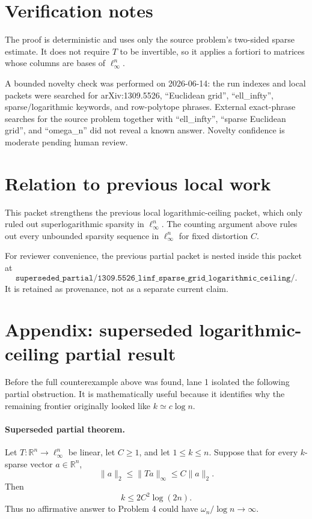 \documentclass[11pt]{article}
\begin{document}
\section*{Verification notes}

The proof is deterministic and uses only the source problem's two-sided
sparse estimate.  It does not require $T$ to be invertible, so it applies
a fortiori to matrices whose columns are bases of $\ell_\infty^n$.

A bounded novelty check was performed on 2026-06-14: the run indexes and
local packets were searched for arXiv:1309.5526, ``Euclidean grid'',
``ell\_infty'', sparse/logarithmic keywords, and row-polytope phrases.
External exact-phrase searches for the source problem together with
``ell\_infty'', ``sparse Euclidean grid'', and ``omega\_n'' did not reveal a
known answer.  Novelty confidence is moderate pending human review.

\section*{Relation to previous local work}

This packet strengthens the previous local logarithmic-ceiling packet, which
only ruled out superlogarithmic sparsity in $\ell_\infty^n$.  The counting
argument above rules out every unbounded sparsity sequence in $\ell_\infty^n$
for fixed distortion $C$.

For reviewer convenience, the previous partial packet is nested inside this
packet at
\[
  \texttt{superseded\_partial/1309.5526\_linf\_sparse\_grid\_logarithmic\_ceiling/}.
\]
It is retained as provenance, not as a separate current claim.

\section*{Appendix: superseded logarithmic-ceiling partial result}

Before the full counterexample above was found, lane 1 isolated the following
partial obstruction.  It is mathematically useful because it identifies why
the remaining frontier originally looked like $k\simeq c\log n$.

\paragraph{Superseded partial theorem.}
Let $T:\mathbb R^n\to\ell_\infty^n$ be linear, let $C\geq 1$, and let
$1\leq k\leq n$.  Suppose that for every $k$-sparse vector
$a\in\mathbb R^n$,
\[
  \|a\|_2\leq \|Ta\|_\infty\leq C\|a\|_2.
\]
Then
\[
  k\leq 2C^2\log(2n).
\]
Thus no affirmative answer to Problem 4 could have
$\omega_n/\log n\to\infty$.
\end{document}
